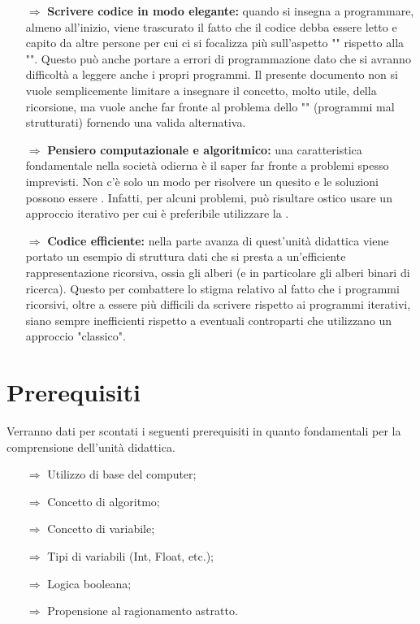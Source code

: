 \begin{itemize}
    \item [$\Rightarrow$] \textbf{Scrivere codice in modo elegante:} quando si insegna
    a programmare, almeno all'inizio, viene trascurato il fatto che il codice debba essere
    letto e capito da altre persone per cui ci si focalizza più sull'aspetto "" rispetto
    alla "". Questo può anche portare a errori di programmazione dato che si avranno
    difficoltà a leggere anche i propri programmi. Il presente documento non si vuole semplicemente
    limitare a insegnare il concetto, molto utile, della ricorsione, ma vuole anche far fronte al
    problema dello "" (programmi mal strutturati) fornendo una valida alternativa.
    \item [$\Rightarrow$] \textbf{Pensiero computazionale e algoritmico:} una caratteristica fondamentale
    nella società odierna è il saper far fronte a problemi spesso imprevisti. Non c'è solo un modo per
    risolvere un quesito e le soluzioni possono essere . Infatti, per alcuni problemi, può
    risultare ostico usare un approccio iterativo per cui è preferibile utilizzare la .
    \item [$\Rightarrow$] \textbf{Codice efficiente:} nella parte avanza di quest'unità didattica viene
    portato un esempio di struttura dati che si presta a un'efficiente rappresentazione ricorsiva, ossia
    gli alberi (e in particolare gli alberi binari di ricerca). Questo per combattere lo stigma
    relativo al fatto che i programmi ricorsivi, oltre a essere più difficili da scrivere rispetto ai programmi iterativi, siano 
    sempre inefficienti rispetto a eventuali controparti che utilizzano un approccio "classico".
\end{itemize}

\section{Prerequisiti}

Verranno dati per scontati i seguenti prerequisiti in quanto fondamentali per la comprensione dell'unità didattica.

\begin{itemize}
    \item [$\Rightarrow$] Utilizzo di base del computer;
    \item [$\Rightarrow$] Concetto di algoritmo;
    \item [$\Rightarrow$] Concetto di variabile;
    \item [$\Rightarrow$] Tipi di variabili (Int, Float, etc.);
    \item [$\Rightarrow$] Logica booleana;
    \item [$\Rightarrow$] Propensione al ragionamento astratto.
\end{itemize}
